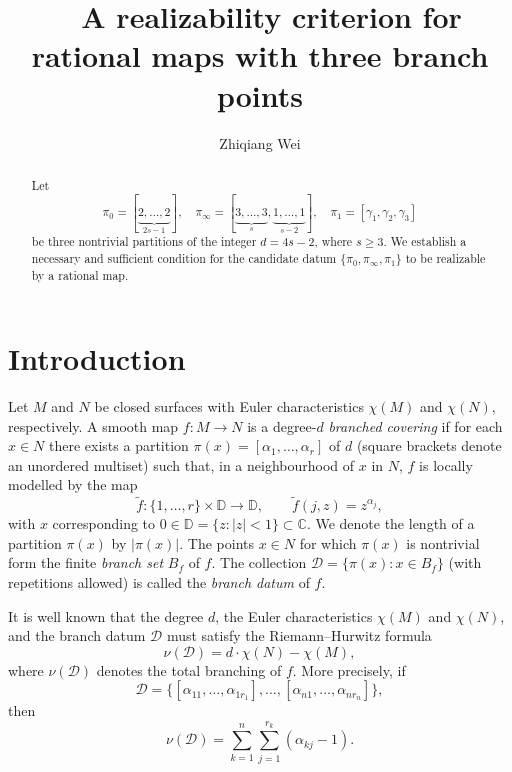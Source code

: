 \documentclass[microtype]{gtpart}     %
\title{$\ \ $ A realizability criterion for rational maps with three branch points}
\author{Zhiqiang Wei}
\theoremstyle{definition}
\begin{document}
\begin{abstract}
Let
\[
\pi_{0}=[\underbrace{2,\ldots,2}_{2s-1}],\quad
\pi_{\infty}=[\underbrace{3,\ldots,3}_{s},\underbrace{1,\ldots,1}_{s-2}],\quad
\pi_{1}=[\gamma_{1},\gamma_{2},\gamma_{3}]
\]
be three nontrivial partitions of the integer \(d=4s-2\), where \(s\ge 3\). We establish a necessary and sufficient condition for the candidate datum \(\{\pi_{0},\pi_{\infty},\pi_{1}\}\) to be realizable by a rational map.
\end{abstract}

\maketitle


\section{Introduction}

Let $M$ and $N$ be closed surfaces with Euler characteristics $\chi(M)$ and $\chi(N)$, respectively. A smooth map $f: M \to N$ is a degree-$d$ \emph{branched covering} if for each $x \in N$ there exists a partition $\pi(x) = [\alpha_1, \ldots, \alpha_r]$ of $d$ (square brackets denote an unordered multiset) such that, in a neighbourhood of $x$ in $N$, $f$ is locally modelled by the map
\[
\widetilde{f}: \{1,\ldots,r\} \times \mathbb{D} \to \mathbb{D}, \qquad \widetilde{f}(j,z) = z^{\alpha_j},
\]
with $x$ corresponding to $0 \in \mathbb{D} = \{z : |z| < 1\} \subset \mathbb{C}$. We denote the length of a partition $\pi(x)$ by $|\pi(x)|$. The points $x \in N$ for which $\pi(x)$ is nontrivial form the finite \emph{branch set} $B_f$ of $f$. The collection $\mathcal{D} = \{\pi(x) : x \in B_f\}$ (with repetitions allowed) is called the \emph{branch datum} of $f$.

It is well known that the degree $d$, the Euler characteristics $\chi(M)$ and $\chi(N)$, and the branch datum $\mathcal D$ must satisfy the Riemann--Hurwitz formula
\begin{equation}\label{RHF}
\nu(\mathcal{D}) = d \cdot \chi(N) - \chi(M),
\end{equation}
where $\nu(\mathcal{D})$ denotes the total branching of $f$. More precisely, if
\[
\mathcal{D} = \{[\alpha_{11},\ldots,\alpha_{1r_1}], \ldots, [\alpha_{n1},\ldots,\alpha_{nr_n}]\},
\]
then
\[
\nu(\mathcal{D}) = \sum_{k=1}^{n} \sum_{j=1}^{r_k} (\alpha_{kj} - 1).
\]
\end{document}
